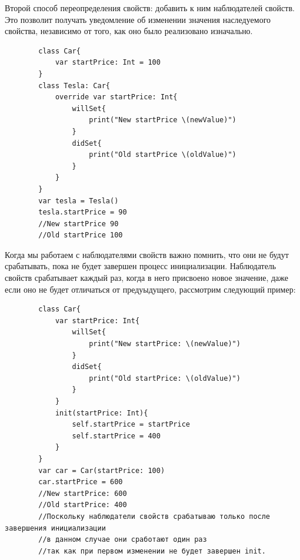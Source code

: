 \documentclass{article}
\begin{document}
    Второй способ переопределения свойств: добавить к ним наблюдателей свойств. Это позволит получать уведомление об изменении значения наследуемого свойства, независимо от того, как оно было реализовано изначально. 
    \begin{verbatim}
        class Car{
            var startPrice: Int = 100
        }
        class Tesla: Car{
            override var startPrice: Int{
                willSet{
                    print("New startPrice \(newValue)")
                }
                didSet{
                    print("Old startPrice \(oldValue)")
                }
            }
        }
        var tesla = Tesla()
        tesla.startPrice = 90
        //New startPrice 90
        //Old startPrice 100
    \end{verbatim}
    Когда мы работаем с наблюдателями свойств важно помнить, что они не будут срабатывать, пока не будет завершен процесс инициализации. Наблюдатель свойств срабатывает каждый раз, когда в него присвоено новое значение, даже если оно не будет отличаться от предуыдущего, рассмотрим следующий пример: 
    \begin{verbatim}
        class Car{
            var startPrice: Int{
                willSet{
                    print("New startPrice: \(newValue)")
                }
                didSet{
                    print("Old startPrice: \(oldValue)")
                }
            }
            init(startPrice: Int){
                self.startPrice = startPrice
                self.startPrice = 400
            }
        }
        var car = Car(startPrice: 100)
        car.startPrice = 600
        //New startPrice: 600
        //Old startPrice: 400
        //Поскольку наблюдатели свойств срабатываю только после завершения инициализации
        //в данном случае они сработают один раз
        //так как при первом изменении не будет завершен init.
    \end{verbatim}
\end{document}
